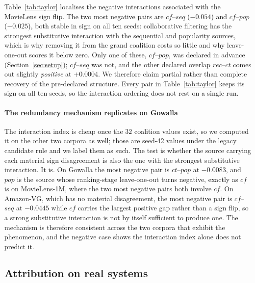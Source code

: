 \documentclass[pdflatex,sn-basic,Numbered]{sn-jnl}
\theoremstyle{plain}
\theoremstyle{definition}
\begin{document}
Table~\ref{tab:taylor} localises the negative interactions associated with the MovieLens sign flip.
The two most negative pairs are $cf$--$seq$ ($-0.054$) and $cf$--$pop$ ($-0.025$),
both stable in sign on all ten seeds:
collaborative filtering has the strongest substitutive interaction with the sequential and popularity
sources, which is why removing it from the grand coalition costs so little and
why leave-one-out scores it below zero. Only one of these, $cf$--$pop$, was
declared in advance (Section~\ref{sec:setup}); $cf$--$seq$ was not, and the other
declared overlap $rec$--$ct$ comes out slightly \emph{positive} at $+0.0004$. We
therefore claim partial rather than complete recovery of the pre-declared
structure. Every
pair in Table~\ref{tab:taylor} keeps its sign on all ten seeds, so the
interaction ordering does not rest on a single run.

\paragraph{The redundancy mechanism replicates on Gowalla}
The interaction index is cheap once the $32$ coalition values exist, so we
computed it on the other two corpora as well; those are seed-42 values under
the legacy candidate rule and we label them as such. The test is whether the
source carrying each material sign disagreement is also the one with the
strongest substitutive interaction. It is. On Gowalla the most negative pair is
$ct$--$pop$ at $-0.0083$, and $pop$ is the source whose ranking-stage
leave-one-out turns negative, exactly as $cf$ is on MovieLens-1M, where the two
most negative pairs both involve $cf$. On Amazon-VG, which has no material
disagreement, the most negative pair is $cf$--$seq$ at $-0.0445$ while $cf$
carries the largest positive gap rather than a sign flip, so a strong
substitutive interaction is not by itself sufficient to produce one. The
mechanism is therefore consistent across the two corpora that exhibit the
phenomenon, and the negative case shows the interaction index alone does not
predict it.

\subsection{Attribution on real systems}\label{sec:results}
\end{document}
